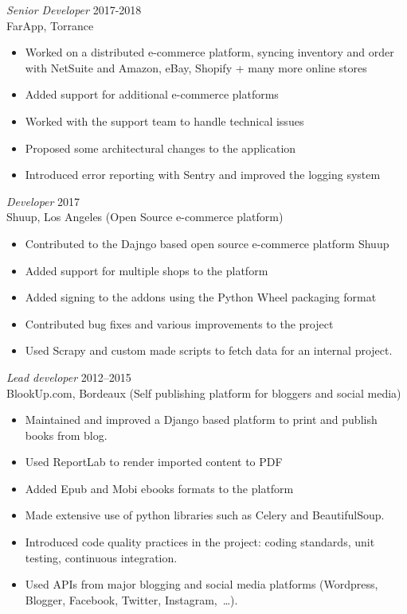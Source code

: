 \documentclass[line,resmargin]{res}
\begin{document}
\begin{resume}
{\sl Senior Developer\/} \hfill 2017-2018\\
FarApp, Torrance
\begin{itemize} \itemsep -2pt
\item Worked on a distributed e-commerce platform, syncing inventory and order with NetSuite and Amazon, eBay, Shopify + many more online stores
\item Added support for additional e-commerce platforms
\item Worked with the support team to handle technical issues
\item Proposed some architectural changes to the application
\item Introduced error reporting with Sentry and improved the logging system
\end{itemize}

{\sl Developer\/} \hfill 2017\\
Shuup, Los Angeles (Open Source e-commerce platform)
\begin{itemize} \itemsep -2pt
    \item Contributed to the Dajngo based open source e-commerce platform Shuup
    \item Added support for multiple shops to the platform
    \item Added signing to the addons using the Python Wheel packaging format
    \item Contributed bug fixes and various improvements to the project
    \item Used Scrapy and custom made scripts to fetch data for an internal project.
\end{itemize}

{\sl Lead developer\/} \hfill 2012--2015\\
BlookUp.com, Bordeaux (Self publishing platform for bloggers and social media)
\begin{itemize} \itemsep -2pt
    \item Maintained and improved a Django based platform to print and publish books from blog.
    \item Used ReportLab to render imported content to PDF
    \item Added Epub and Mobi ebooks formats to the platform
    \item Made extensive use of python libraries such as Celery and BeautifulSoup.
    \item Introduced code quality practices in the project: coding standards, unit testing, continuous integration.
    \item Used APIs from major blogging and social media platforms (Wordpress, Blogger, Facebook, Twitter, Instagram, …).
\end{itemize}


\end{resume}
\end{document}
